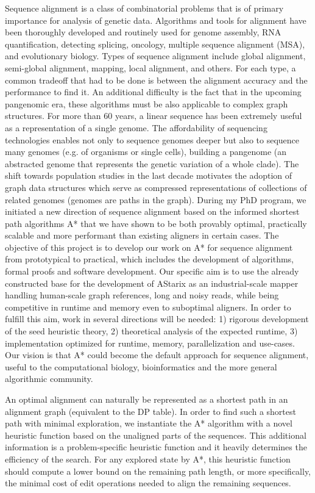 Sequence alignment is a class of combinatorial problems that is of primary
importance for analysis of genetic data. Algorithms and tools for alignment have
been thoroughly developed and routinely used for genome assembly, RNA
quantification, detecting splicing, oncology, multiple sequence alignment (MSA),
and evolutionary biology. Types of sequence alignment include global alignment,
semi-global alignment, mapping, local alignment, and others. For each type, a
common tradeoff that had to be done is between the alignment accuracy and the
performance to find it. An additional difficulty is the fact that in the
upcoming pangenomic era, these algorithms must be also applicable to complex
graph structures. For more than 60 years, a linear sequence has been extremely
useful as a representation of a single genome. The affordability of sequencing
technologies enables not only to sequence genomes deeper but also to sequence
many genomes (e.g. of organisms or single cells), building a pangenome (an
abstracted genome that represents the genetic variation of a whole clade). The
shift towards population studies in the last decade motivates the adoption of
graph data structures which serve as compressed representations of collections
of related genomes (genomes are paths in the graph). During my PhD program, we
initiated a new direction of sequence alignment based on the informed shortest
path algorithms A* that we have shown to be both provably optimal, practically
scalable and more performant than existing aligners in certain cases. The
objective of this project is to develop our work on A* for sequence alignment
from prototypical to practical, which includes the development of algorithms,
formal proofs and software development. Our specific aim is to use the already
constructed base for the development of AStarix as an industrial-scale mapper
handling human-scale graph references, long and noisy reads, while being
competitive in runtime and memory even to suboptimal aligners. In order to
fulfill this aim, work in several directions will be needed: 1) rigorous
development of the seed heuristic theory, 2) theoretical analysis of the
expected runtime, 3) implementation optimized for runtime, memory,
parallelization and use-cases. Our vision is that A* could become the default
approach for sequence alignment, useful to the computational biology,
bioinformatics and the more general algorithmic community.

An optimal alignment can naturally be represented as a shortest path in an
alignment graph (equivalent to the DP table). In order to find such a shortest
path with minimal exploration, we instantiate the A* algorithm with a novel
heuristic function based on the unaligned parts of the sequences. This
additional information is a problem-specific heuristic function and it heavily
determines the efficiency of the search. For any explored state by A*, this
heuristic function should compute a lower bound on the remaining path length, or
more specifically, the minimal cost of edit operations needed to align the
remaining sequences.











